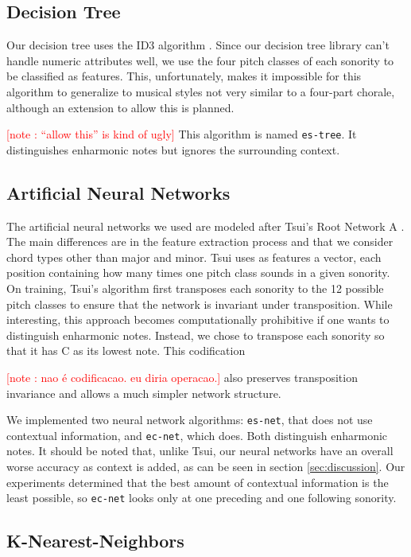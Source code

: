 \documentclass{article}
\newcounter{notecounter}
\newcommand{\note}[1]{
  \addtocounter{notecounter}{1}
  \textcolor{red}{[note \arabic{notecounter}: #1]}
}
\begin{document}
\subsection{Decision Tree}
\label{sec:tree}

Our decision tree uses the ID3 algorithm \cite{mitchell97:machine}.
Since our decision tree library can't handle numeric attributes well,
we use the four pitch classes of each sonority to be classified as
features. This, unfortunately, makes it impossible for this algorithm
to generalize to musical styles not very similar to a four-part
chorale, although an extension to allow this is planned. \note{``allow
  this'' is kind of ugly} This algorithm is named \texttt{es-tree}. It
distinguishes enharmonic notes but ignores the surrounding context.

\subsection{Artificial Neural Networks}
\label{sec:neural-net}


The artificial neural networks we used are modeled after Tsui's Root
Network A \cite{tsui02:harmonic}. The main differences are in the
feature extraction process and that we consider chord types other than
major and minor. Tsui uses as features a vector, each position
containing how many times one pitch class sounds in a given sonority.
On training, Tsui's algorithm first transposes each sonority to the 12
possible pitch classes to ensure that the network is invariant under
transposition. While interesting, this approach becomes
computationally prohibitive if one wants to distinguish enharmonic
notes. Instead, we chose to transpose each sonority so that it has C
as its lowest note. This codification \note{nao é codificacao. eu
  diria operacao.} also preserves transposition invariance and allows
a much simpler network structure.

We implemented two neural network algorithms: \texttt{es-net}, that
does not use contextual information, and \texttt{ec-net}, which
does. Both distinguish enharmonic notes.  It should be noted that,
unlike Tsui, our neural networks have an overall worse accuracy as
context is added, as can be seen in section \ref{sec:discussion}. Our
experiments determined that the best amount of contextual information
is the least possible, so \texttt{ec-net} looks only at one preceding
and one following sonority.


\subsection{K-Nearest-Neighbors}
\label{sec:knn}
\end{document}
